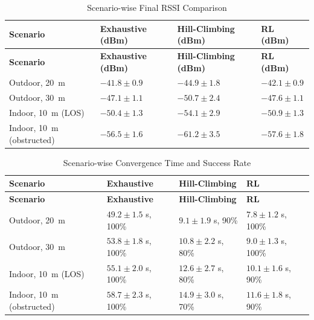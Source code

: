 \vspace{0.5cm}
\renewcommand{\arraystretch}{1.25}
\setlength{\LTpre}{8pt}
\setlength{\LTpost}{8pt}
\begin{longtable}{|
>{\raggedright\arraybackslash}p{3.6cm}|
>{\raggedright\arraybackslash}p{3.5cm}|
>{\raggedright\arraybackslash}p{3cm}|
>{\raggedright\arraybackslash}p{3cm}|}
\caption{Scenario-wise Final RSSI Comparison}
\label{tab:scenario_rssi_comparison}\\
\hline
\textbf{Scenario} & \textbf{Exhaustive (dBm)} & \textbf{Hill-Climbing (dBm)} & \textbf{RL (dBm)} \\
\hline
\endfirsthead
\hline
\textbf{Scenario} & \textbf{Exhaustive (dBm)} & \textbf{Hill-Climbing (dBm)} & \textbf{RL (dBm)} \\
\hline
\endhead
Outdoor, 20~m & $-41.8 \pm 0.9$ & $-44.9 \pm 1.8$ & $-42.1 \pm 0.9$ \\
\hline
Outdoor, 30~m & $-47.1 \pm 1.1$ & $-50.7 \pm 2.4$ & $-47.6 \pm 1.1$ \\
\hline
Indoor, 10~m (LOS) & $-50.4 \pm 1.3$ & $-54.1 \pm 2.9$ & $-50.9 \pm 1.3$ \\
\hline
Indoor, 10~m (obstructed) & $-56.5 \pm 1.6$ & $-61.2 \pm 3.5$ & $-57.6 \pm 1.8$ \\
\hline
\end{longtable}

\vspace{0.5cm}
\renewcommand{\arraystretch}{1.25}
\begin{longtable}{|
>{\raggedright\arraybackslash}p{4.2cm}|
>{\raggedright\arraybackslash}p{3.0cm}|
>{\raggedright\arraybackslash}p{3.0cm}|
>{\raggedright\arraybackslash}p{3.0cm}|}
\caption{Scenario-wise Convergence Time and Success Rate}
\label{tab:scenario_time_success}\\
\hline
\textbf{Scenario} & \textbf{Exhaustive} & \textbf{Hill-Climbing} & \textbf{RL} \\
\hline
\endfirsthead
\hline
\textbf{Scenario} & \textbf{Exhaustive} & \textbf{Hill-Climbing} & \textbf{RL} \\
\hline
\endhead
Outdoor, 20~m & $49.2 \pm 1.5$ s, 100\% & $9.1 \pm 1.9$ s, 90\% & $\mathbf{7.8 \pm 1.2}$ s, 100\% \\
\hline
Outdoor, 30~m & $53.8 \pm 1.8$ s, 100\% & $10.8 \pm 2.2$ s, 80\% & $\mathbf{9.0 \pm 1.3}$ s, 100\% \\
\hline
Indoor, 10~m (LOS) & $55.1 \pm 2.0$ s, 100\% & $12.6 \pm 2.7$ s, 80\% & $\mathbf{10.1 \pm 1.6}$ s, 90\% \\
\hline
Indoor, 10~m (obstructed) & $58.7 \pm 2.3$ s, 100\% & $14.9 \pm 3.0$ s, 70\% & $\mathbf{11.6 \pm 1.8}$ s, 90\% \\
\hline
\end{longtable}

